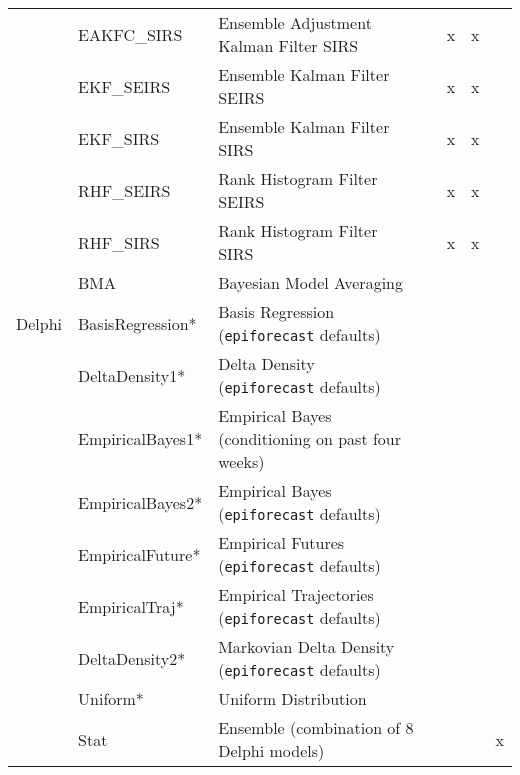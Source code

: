 \begin{table*}
\begin{tabular}{p{1.6cm} l p{7.5cm} l  p{1cm}  p{1cm} p{1cm}}
~        & EAKFC\_SIRS        & Ensemble Adjustment Kalman Filter SIRS & \cite{Pei2017}  & x & x & \\
~        & EKF\_SEIRS         & Ensemble Kalman Filter SEIRS & \cite{Yang2014}    & x             & x &                    \\
~        & EKF\_SIRS          & Ensemble Kalman Filter SIRS & \cite{Yang2014}     & x             & x   &                 \\
~        & RHF\_SEIRS         & Rank Histogram Filter SEIRS & \cite{Yang2014}    & x             & x     &               \\
~        & RHF\_SIRS          & Rank Histogram Filter SIRS & \cite{Yang2014}     & x             & x       &             \\
~        & BMA                & Bayesian Model Averaging & \cite{Yamana2017}      & ~             & ~          &          \\
\hline
Delphi   & BasisRegression*    & Basis Regression ({\tt epiforecast} defaults) & \cite{Brooks2015a} & ~             & ~     &               \\ 
~        & DeltaDensity1*      & Delta Density ({\tt epiforecast} defaults)   & \cite{Brooks2018} & ~             & ~       &             \\ 
~        & EmpiricalBayes1*    & Empirical Bayes (conditioning on past four weeks) & \cite{Brooks2015,Brooks2015a} & ~             & ~  &                  \\ 
~        & EmpiricalBayes2*    & Empirical Bayes ({\tt epiforecast} defaults) & \cite{Brooks2015,Brooks2015a} & ~             & ~            &        \\ 
~        & EmpiricalFuture*    & Empirical Futures ({\tt epiforecast} defaults) &  \cite{Brooks2015a} & ~             & ~         &           \\ 
~        & EmpiricalTraj*      & Empirical Trajectories ({\tt epiforecast} defaults)& \cite{Brooks2015a} & ~             & ~         &           \\ 
~        & DeltaDensity2*      & Markovian Delta Density ({\tt epiforecast} defaults)& \cite{Brooks2018} & ~             & ~          &          \\ 
~        & Uniform*            & Uniform Distribution&  & ~             & ~   &                 \\ 
~        & Stat               & Ensemble (combination of 8 Delphi models)& \cite{Brooks2018} & ~             & ~  & x                 \\

\end{tabular}
\end{table*}
